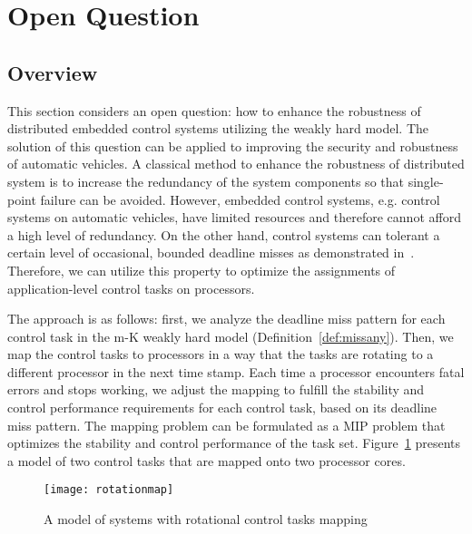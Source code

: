 \section{Open Question} \label{rotation}

\subsection{Overview}
This section considers an open question: how to enhance the robustness of distributed embedded control systems utilizing the weakly hard model. The solution of this question can be applied to improving the security and robustness of automatic vehicles. A classical method to enhance the robustness of distributed system is to increase the redundancy of the system components so that single-point failure can be avoided. However, embedded control systems, e.g. control systems on automatic vehicles, have limited resources and therefore cannot afford a high level of redundancy. On the other hand, control systems can tolerant a certain level of occasional, bounded deadline misses as demonstrated in~\cite{liang2019security, maggio2020control, ramanathan1999overload, goswami2014relax, horssen2016performance, linsenmayer2017stabilization, pazzaglia2018beyond}. Therefore, we can utilize this property to optimize the assignments of application-level control tasks on processors. 

The approach is as follows: first, we analyze the deadline miss pattern for each control task in the m-K weakly hard model (Definition~\ref{def:missany}). Then, we map the control tasks to processors in a way that the tasks are rotating to a different processor in the next time stamp. Each time a processor encounters fatal errors and stops working, we adjust the mapping to fulfill the stability and control performance requirements for each control task, based on its deadline miss pattern. The mapping problem can be formulated as a MIP problem that optimizes the stability and control performance of the task set. Figure~\ref{fig:rotationmap} presents a model of two control tasks that are mapped onto two processor cores. 

\begin{figure}[h]
\caption{A model of systems with rotational control tasks mapping}
\centering
\texttt{[image: rotationmap]}
\label{fig:rotationmap}
\end{figure}

